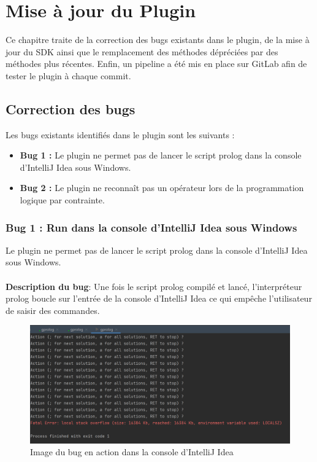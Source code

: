 \chapter{Mise à jour du Plugin}



\noindent
Ce chapitre traite de la correction des bugs existants dans le plugin, de la mise à jour du SDK ainsi que le remplacement des méthodes dépréciées par des méthodes plus récentes.
Enfin, un pipeline a été mis en place sur GitLab afin de tester le plugin à chaque commit.


\section{Correction des bugs}
\noindent Les bugs existants identifiés dans le plugin sont les suivants :

\begin{itemize}
    \item \textbf{Bug 1 :} Le plugin ne permet pas de lancer le script prolog dans la console d'IntelliJ Idea sous Windows.
    \item \textbf{Bug 2 :} Le plugin ne reconnaît pas un opérateur lors de la programmation logique par contrainte.
\end{itemize}

\subsection{Bug 1 : Run dans la console d'IntelliJ Idea sous Windows}
\noindent
Le plugin ne permet pas de lancer le script prolog dans la console d'IntelliJ Idea sous Windows.
\\
\\
\textbf{Description du bug}: Une fois le script prolog compilé et lancé, l'interpréteur prolog boucle sur l'entrée de la console d'IntelliJ Idea ce qui empêche l'utilisateur de saisir des commandes.
\\
\begin{figure}
    \centering
    \includegraphics[scale=.85]{images/Bug_1_Windows.png}
    \caption{Image du bug en action dans la console d'IntelliJ Idea}
    \label{fig:bug_1_windows}
\end{figure}

